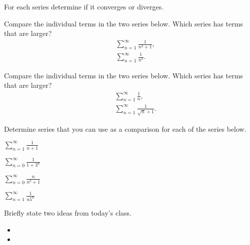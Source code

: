 \begin{problem}
\item For each series determine if it converges or diverges. 
  \begin{subproblem}
  \item Compare the individual terms in the two series below. Which
    series has terms that are larger?
    \begin{eqnarray*}
      & & \sum^\infty_{n=1} \frac{1}{n^3+1}, \\
      & & \sum^\infty_{n=1} \frac{1}{n^3}.
    \end{eqnarray*}
    \vfill
  \item Compare the individual terms in the two series below. Which
    series has terms that are larger?
    \begin{eqnarray*}
      & & \sum^\infty_{n=1} \frac{1}{n}, \\
      & & \sum^\infty_{n=1} \frac{1}{\sqrt{n}+1}.
    \end{eqnarray*}
    \vfill
  \end{subproblem}
\end{problem}


\begin{problem}
\item Determine series that you can use as a comparison for each of
  the series below.
  \begin{subproblem}
    \item $\sum_{n=1}^\infty \frac{1}{n+1}$
      \vfill
    \item $\sum_{n=0}^\infty \frac{1}{1+3^n}$
      \vfill
    \item $\sum_{n=0}^\infty \frac{n}{n^2+1} $
      \vfill
    \item $\sum_{n=1}^\infty \frac{1}{n5^n}$
      \vfill
  \end{subproblem}
\end{problem}


\postClass

\begin{problem}
\item Briefly state two ideas from today's class.
  \begin{itemize}
  \item 
  \item 
  \end{itemize}
\item 
  \begin{subproblem}
    \item
  \end{subproblem}
\end{problem}


